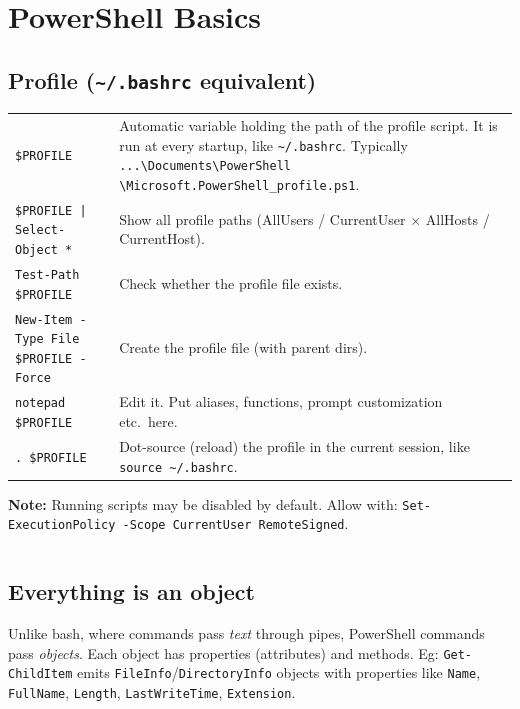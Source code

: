 \section{PowerShell Basics}

\subsection{Profile ({\normalfont\texttt{\~{}/.bashrc}} equivalent)}

\begin{tabularx}{\linewidth}{lX}
    \texttt{\$PROFILE} & Automatic variable holding the path of the profile script. It is run at every startup, like \texttt{\~{}/.bashrc}. Typically \texttt{...\textbackslash Documents\textbackslash PowerShell \textbackslash Microsoft.PowerShell\_profile.ps1}.\\
    \texttt{\$PROFILE | Select-Object *} & Show all profile paths (AllUsers / CurrentUser $\times$ AllHosts / CurrentHost).\\
    \texttt{Test-Path \$PROFILE} & Check whether the profile file exists.\\
    \texttt{New-Item -Type File \$PROFILE -Force} & Create the profile file (with parent dirs).\\
    \texttt{notepad \$PROFILE} & Edit it. Put aliases, functions, prompt customization etc.\ here.\\
    \texttt{. \$PROFILE} & Dot-source (reload) the profile in the current session, like \texttt{source \~{}/.bashrc}.\\
    \hline
\end{tabularx}

\textbf{Note:} Running scripts may be disabled by default. Allow with: \texttt{Set-ExecutionPolicy -Scope CurrentUser RemoteSigned}.

\begin{tabularx}{\linewidth}{lX}
    \hline
\end{tabularx}

\subsection{Everything is an object}

Unlike bash, where commands pass \emph{text} through pipes, PowerShell commands pass \emph{objects}. Each object has properties (attributes) and methods. Eg: \texttt{Get-ChildItem} emits \texttt{FileInfo}/\texttt{DirectoryInfo} objects with properties like \texttt{Name}, \texttt{FullName}, \texttt{Length}, \texttt{LastWriteTime}, \texttt{Extension}.\\

